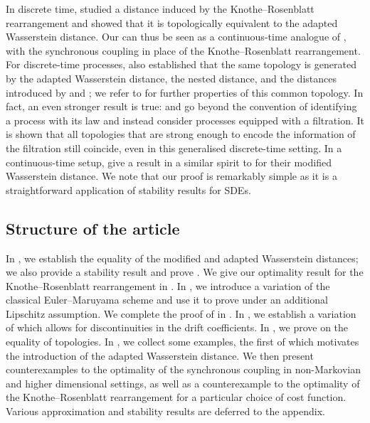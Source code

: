 \documentclass[oneside]{amsart}
\theoremstyle{definition}
\numberwithin{equation}{section}
\begin{document}
	In discrete time, \citet{BePaPo21} studied a distance induced by the Knothe--Rosenblatt rearrangement and showed that it is topologically equivalent to the adapted Wasserstein distance. Our  can thus be seen as a continuous-time analogue of \cite[Theorem 1.4]{BePaPo21}, with the synchronous coupling in place of the Knothe--Rosenblatt rearrangement.
	For discrete-time processes, \cite{BaBaBeEd19b} also established that the same topology is generated by the adapted Wasserstein distance, the nested distance, and the distances introduced by \citet{Al81} and \citet{He96}; we refer to \cite{BaBeEdPi17,Ed19} for further properties of this common topology.
	In fact, an even stronger result is true: \citet{BaBePa21} and \citet{Pa22} go beyond the convention of identifying a process with its law and instead consider processes equipped with a filtration. It is shown that all topologies that are strong enough to encode the information of the filtration still coincide, even in this generalised discrete-time setting.
	In a continuous-time setup, \citet[Propositions 1.8, 1.9]{BiTa19} give a result in a similar spirit to  for their modified Wasserstein distance. We note that our proof is remarkably simple as it is a straightforward application of stability results for SDEs.
	

	
\subsection*{Structure of the article}

In , we establish the equality of the modified and adapted Wasserstein distances; we also provide a stability result and prove .
We give our optimality result for the Knothe--Rosenblatt rearrangement in . In , we introduce a variation of the classical Euler--Maruyama scheme and use it to prove  under an additional Lipschitz assumption. We complete the proof of  in . In , we establish a variation of  which allows for discontinuities in the drift coefficients.
In , we prove  on the equality of topologies.
In , we collect some examples, the first of which motivates the introduction of the adapted Wasserstein distance. We then present counterexamples to the optimality of the synchronous coupling in non-Markovian and higher dimensional settings, as well as a counterexample to the optimality of the Knothe--Rosenblatt rearrangement for a particular choice of cost function. Various approximation and stability results are deferred to the appendix. 
\end{document}
